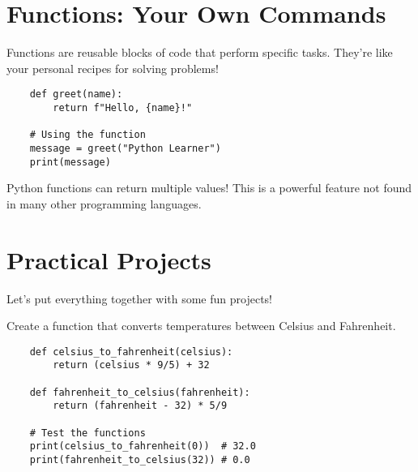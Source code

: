 \section{Functions: Your Own Commands}
\label{sec:functions}

\begin{definition}[Functions]
    Functions are reusable blocks of code that perform specific tasks. They're like your personal recipes for solving problems!
\end{definition}

\begin{example}
    \begin{verbatim}
    def greet(name):
        return f"Hello, {name}!"
    
    # Using the function
    message = greet("Python Learner")
    print(message)
    \end{verbatim}
\end{example}

\begin{note}
    Python functions can return multiple values! This is a powerful feature not found in many other programming languages.
\end{note}

\section{Practical Projects}
\label{sec:projects}

Let's put everything together with some fun projects!

\begin{exercise}
    Create a function that converts temperatures between Celsius and Fahrenheit.
\end{exercise}

\begin{solution}
    \begin{verbatim}
    def celsius_to_fahrenheit(celsius):
        return (celsius * 9/5) + 32
    
    def fahrenheit_to_celsius(fahrenheit):
        return (fahrenheit - 32) * 5/9
    
    # Test the functions
    print(celsius_to_fahrenheit(0))  # 32.0
    print(fahrenheit_to_celsius(32)) # 0.0
    \end{verbatim}
\end{solution}